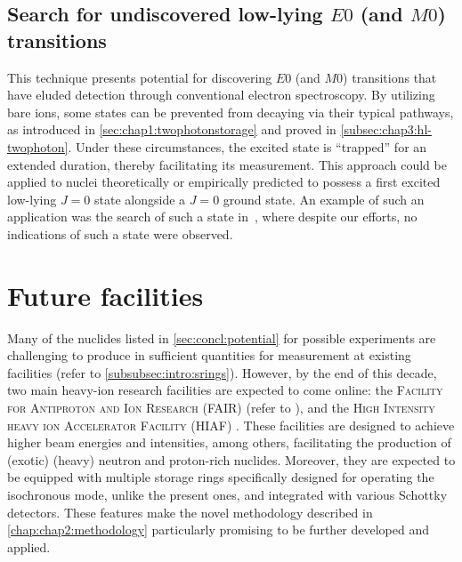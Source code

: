\subsection{Search for undiscovered low-lying $E0$ (and $M0$) transitions}\label{subsec:concl:undiscovered}
This technique presents potential for discovering $E0$ (and $M0$) transitions that have eluded detection through conventional electron spectroscopy. By utilizing bare ions, some states can be prevented from decaying via their typical pathways, as introduced in \cref{sec:chap1:twophotonstorage} and proved in \cref{subsec:chap3:hl-twophoton}. Under these circumstances, the excited state is ``trapped'' for an extended duration, thereby facilitating its measurement. This approach could be applied to nuclei theoretically or empirically predicted to possess a first excited low-lying $J=0$ state alongside a $J=0$ ground state. An example of such an application was the search of such a state in \,, where despite our efforts, no indications of such a state were observed.

\section{Future facilities}
Many of the nuclides listed in \cref{sec:concl:potential} for possible experiments are challenging to produce in sufficient quantities for measurement at existing facilities (refer to \cref{subsubsec:intro:srings}). However, by the end of this decade, two main heavy-ion research facilities are expected to come online: the \textsc{Facility for Antiproton and Ion Research} (\textsc{FAIR}) (refer to \cite{SPILLER2006305}), and the \textsc{High Intensity heavy ion Accelerator Facility} (\textsc{HIAF}) \cite{YANG2013263}. These facilities are designed to achieve higher beam energies and intensities, among others, facilitating the production of (exotic) (heavy) neutron and proton-rich nuclides. Moreover, they are expected to be equipped with multiple storage rings specifically designed for operating the isochronous mode, unlike the present ones, and integrated with various Schottky detectors. These features make the novel methodology described in \cref{chap:chap2:methodology} particularly promising to be further developed and applied.

\begin{center}
    \vspace*{1cm}
    \vspace*{\fill}
\end{center}
